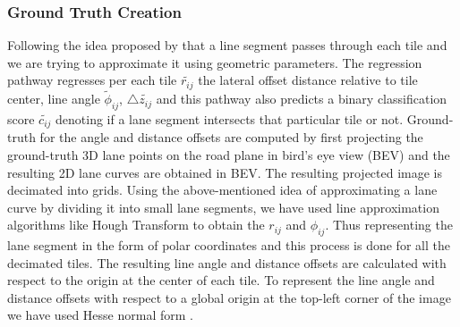         \subsubsection{Ground Truth Creation}
        Following the idea proposed by \cite{DBLP:journals/corr/abs-2011-01535} that a line segment passes through each tile and we are trying to approximate it using geometric parameters. The regression pathway \cite{DBLP:journals/corr/abs-2011-01535}regresses per each tile $\widetilde{r_{ij}}$ the lateral offset distance relative to tile center, line angle $\widetilde{\phi}_{ij}$, $\triangle{\widetilde{z_{ij}}}$ and this pathway also predicts a binary classification score $\widetilde{c_{ij}}$ denoting if a lane segment intersects that particular tile or not. 
        Ground-truth for the angle and distance offsets are computed by first projecting the ground-truth 3D lane points on the road plane in bird's eye view (BEV) and the resulting 2D lane curves are obtained in BEV. The resulting projected image is decimated into grids. Using the above-mentioned idea of approximating a lane curve by dividing it into small lane segments, we have used line approximation algorithms like Hough Transform to obtain the $r_{ij}$ and $\phi_{ij}$. Thus representing the lane segment in the form of polar coordinates and this process is done for all the decimated tiles. The resulting line angle and distance offsets are calculated with respect to the origin at the center of each tile. To represent the line angle and distance offsets with respect to a global origin at the top-left corner of the image we have used Hesse normal form . 
        
